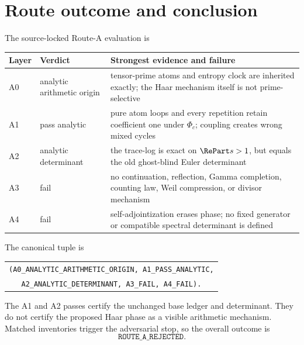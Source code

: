 \section{Route outcome and conclusion}
\label{sec:route}

The source-locked Route-A evaluation is
\begin{center}\small
\begin{tabularx}{0.98\textwidth}{L{0.08\textwidth}L{0.25\textwidth}X}
\toprule
Layer & Verdict & Strongest evidence and failure\\\midrule
A0 & analytic arithmetic origin & tensor-prime atoms and entropy clock are inherited exactly; the Haar mechanism itself is not prime-selective\\
A1 & pass analytic & pure atom loops and every repetition retain coefficient one under $\Phi_c$; coupling creates wrong mixed cycles\\
A2 & analytic determinant & the trace-log is exact on $\RePart s>1$, but equals the old ghost-blind Euler determinant\\
A3 & fail & no continuation, reflection, Gamma completion, counting law, Weil compression, or divisor mechanism\\
A4 & fail & self-adjointization erases phase; no fixed generator or compatible spectral determinant is defined\\
\bottomrule
\end{tabularx}
\end{center}

The canonical tuple is
\begin{center}\small
\begin{tabular}{c}
\texttt{(A0\_ANALYTIC\_ARITHMETIC\_ORIGIN, A1\_PASS\_ANALYTIC,}\\
\texttt{A2\_ANALYTIC\_DETERMINANT, A3\_FAIL, A4\_FAIL).}
\end{tabular}
\end{center}
The A1 and A2 passes certify the unchanged base ledger and determinant.  They
do not certify the proposed Haar phase as a visible arithmetic mechanism.
Matched inventories trigger the adversarial stop, so the overall outcome is
\[
 \boxed{\texttt{ROUTE\_A\_REJECTED}.}                      \tag{6.1}
\]

\begin{center}\end{center}

